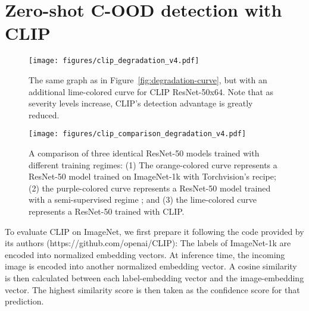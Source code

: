 \documentclass[table]{article} \usepackage{PRIMEarxiv}
\begin{document}
\section{Zero-shot C-OOD detection with CLIP}
\label{sec:clip}
\begin{figure*}[h]
    \centering
    \texttt{[image: figures/clip\_degradation\_v4.pdf]}
    \caption{The same graph as in Figure~\ref{fig:degradation-curve}, but with an additional lime-colored curve for CLIP ResNet-50x64. Note that as severity levels increase, CLIP's detection advantage is greatly reduced.}
    \label{fig:clip_degradation}
\end{figure*}
\begin{figure*}[h]
    \centering
    \texttt{[image: figures/clip\_comparison\_degradation\_v4.pdf]}
    \caption{A comparison of three identical ResNet-50 models trained with different training regimes: (1) The orange-colored curve represents a ResNet-50 model trained on ImageNet-1k with Torchvision's recipe; (2) the purple-colored curve represents a ResNet-50 model trained with a semi-supervised regime \citep{DBLP:journals/corr/abs-1905-00546}; and (3) the lime-colored curve represents a ResNet-50 trained with CLIP.}
    \label{fig:clip_resnet_degradation}
\end{figure*}
To evaluate CLIP on ImageNet, we first prepare it following the code provided by its authors (https://github.com/openai/CLIP):
The labels of ImageNet-1k are encoded into normalized embedding vectors. At inference time, the incoming image is encoded into another normalized embedding vector. A cosine similarity is then calculated between each label-embedding vector and the image-embedding vector. The highest similarity score is then taken as the confidence score for that prediction.
\end{document}
